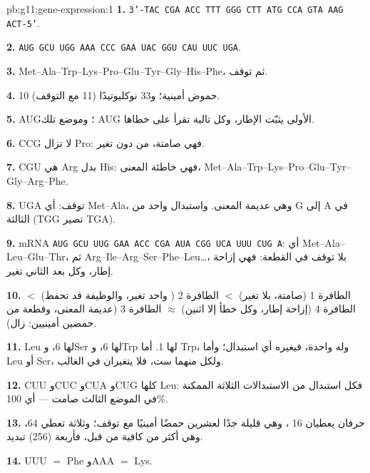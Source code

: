 \begin{solution}{pb:g11:gene-expression:1}
\textbf{1.} \texttt{3'-TAC CGA ACC TTT GGG CTT ATG CCA GTA AAG ACT-5'}.

\textbf{2.} \texttt{AUG GCU UGG AAA CCC GAA UAC GGU CAU UUC UGA}.

\textbf{3.} Met--Ala--Trp--Lys--Pro--Glu--Tyr--Gly--His--Phe، ثم توقف.

\textbf{4.} 10 حموض أمينية؛ و33 نوكليوتيدًا (11  مع 
التوقف).

\textbf{5.} AUG؛ وموضع تلك AUG الأولى يثبّت الإطار، وكل  تالية
تقرأ على خطاها.

\textbf{6.} CCG لا تزال Pro: فهي صامتة،  من دون تغير.

\textbf{7.} CGU هي Arg بدل His: فهي خاطئة المعنى،
Met--Ala--Trp--Lys--Pro--Glu--Tyr--Gly--Arg--Phe.

\textbf{8.} UGA توقف: أي Met--Ala، وهي عديمة المعنى. واستبدال واحد من
G إلى A في  الثالثة (TGG تصير TGA).

\textbf{9.} mRNA \texttt{AUG GCU UUG GAA ACC CGA AUA CGG UCA UUU CUG
A}: أي Met--Ala--Leu--Glu--Thr، ثم Arg--Ile--Arg--Ser--Phe--Leu\dots،
بلا
توقف في القطعة: فهي إزاحة إطار، وكل  بعد الثاني تغير.

\textbf{10.} الطافرة 1 (صامتة، بلا تغير) $<$ الطافرة 2 ( واحد
تغير، والوظيفة قد تحفظ) $<$ الطافرة 4 (إزاحة إطار، وكل 
خطأ إلا اثنين) $\approx$ الطافرة 3 (عديمة المعنى، وقطعة من حمضين
أمينيين:  زال).

\textbf{11.} Leu لها 6، وSer لها 6، وTrp لها 1. أما Trp، وله 
واحدة، فيغيره أي استبدال؛ وأما Leu أو Ser، ولكل منهما ست، فلا يتغيران
في الغالب.

\textbf{12.} CUU وCUC وCUA وCUG كلها Leu: فكل استبدال من الاستبدالات
الثلاثة الممكنة في الموضع الثالث صامت --- أي 100\%.

\textbf{13.} حرفان يعطيان 16 ، وهي قليلة جدًا لعشرين حمضًا
أمينيًا مع توقف؛ وثلاثة تعطي 64، وهي أكثر من كافية من قبل، فأربعة
(256) تبديد.

\textbf{14.} UUU $=$ Phe وAAA $=$ Lys.


\end{solution}
